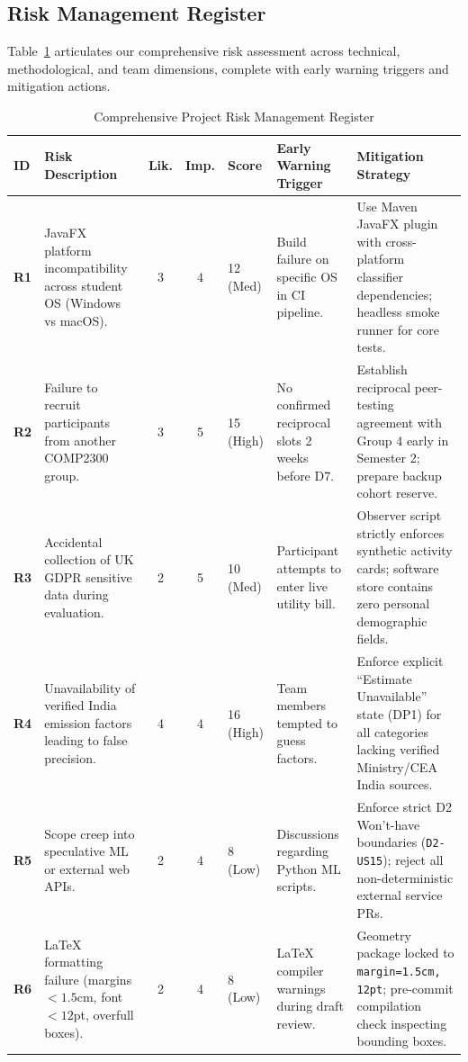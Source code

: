 \documentclass[12pt,a4paper]{article}
\newcommand{\code}[1]{\texttt{#1}}
\begin{document}
\subsection{Risk Management Register}
Table~\ref{tab:risks} articulates our comprehensive risk assessment across technical, methodological, and team dimensions, complete with early warning triggers and mitigation actions.

\begin{table}[ht]
\centering
\scriptsize
\caption{Comprehensive Project Risk Management Register}
\label{tab:risks}
\begin{tabularx}{\textwidth}{@{}p{0.8cm}p{2.6cm}ccp{1.0cm}p{3.2cm}p{3.6cm}@{}}
\toprule
\textbf{ID} & \textbf{Risk Description} & \textbf{Lik.} & \textbf{Imp.} & \textbf{Score} & \textbf{Early Warning Trigger} & \textbf{Mitigation Strategy}\\
\midrule
\textbf{R1} & JavaFX platform incompatibility across student OS (Windows vs macOS). & 3 & 4 & 12 (Med) & Build failure on specific OS in CI pipeline. & Use Maven JavaFX plugin with cross-platform classifier dependencies; headless smoke runner for core tests.\\
\textbf{R2} & Failure to recruit participants from another COMP2300 group. & 3 & 5 & 15 (High) & No confirmed reciprocal slots 2 weeks before D7. & Establish reciprocal peer-testing agreement with Group 4 early in Semester 2; prepare backup cohort reserve.\\
\textbf{R3} & Accidental collection of UK GDPR sensitive data during evaluation. & 2 & 5 & 10 (Med) & Participant attempts to enter live utility bill. & Observer script strictly enforces synthetic activity cards; software store contains zero personal demographic fields.\\
\textbf{R4} & Unavailability of verified India emission factors leading to false precision. & 4 & 4 & 16 (High) & Team members tempted to guess factors. & Enforce explicit ``Estimate Unavailable'' state (DP1) for all categories lacking verified Ministry/CEA India sources.\\
\textbf{R5} & Scope creep into speculative ML or external web APIs. & 2 & 4 & 8 (Low) & Discussions regarding Python ML scripts. & Enforce strict D2 Won't-have boundaries (\code{D2-US15}); reject all non-deterministic external service PRs.\\
\textbf{R6} & LaTeX formatting failure (margins $<1.5$cm, font $<12$pt, overfull boxes). & 2 & 4 & 8 (Low) & LaTeX compiler warnings during draft review. & Geometry package locked to \code{margin=1.5cm, 12pt}; pre-commit compilation check inspecting bounding boxes.\\

\end{tabularx}
\end{table}
\end{document}
